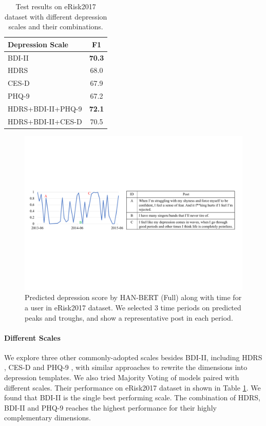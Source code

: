 \begin{table}[th]
    \centering
	\small
    \begin{tabular}{l|c}
        \hline
        Depression Scale & F1 \\
        \hline
        BDI-II & \textbf{70.3} \\
        HDRS & 68.0 \\
        CES-D & 67.9 \\
        PHQ-9 & 67.2\\
        \hline
        HDRS+BDI-II+PHQ-9 & \textbf{72.1} \\
        HDRS+BDI-II+CES-D & 70.5 \\
        \hline
    \end{tabular}
    \caption{\label{table:different scales} Test results on eRisk2017 dataset with different depression scales and their combinations.}
\end{table}

\begin{figure}[th]
    \centering
    \includegraphics[width=2\columnwidth]{figures/curve.pdf}
    \caption{Predicted depression score by HAN-BERT (Full) along with time for a user in eRisk2017 dataset. We selected 3 time periods on predicted peaks and troughs, and show a representative post in each period.}
    \label{fig:curve}
\end{figure}

\paragraph{Different Scales}
We explore three other commonly-adopted scales besides BDI-II, including HDRS \citep{hamilton1986hamilton}, CES-D \citep{Lenore1977CES-D} and PHQ-9 \citep{kroenke2001phq}, with similar approaches to rewrite the dimensions into depression templates. We also tried Majority Voting of models paired with different scales. Their performance on eRisk2017 dataset in shown in Table \ref{table:different scales}. We found that BDI-II is the single best performing scale. The combination of HDRS, BDI-II and PHQ-9 reaches the highest performance for their highly complementary dimensions. 

